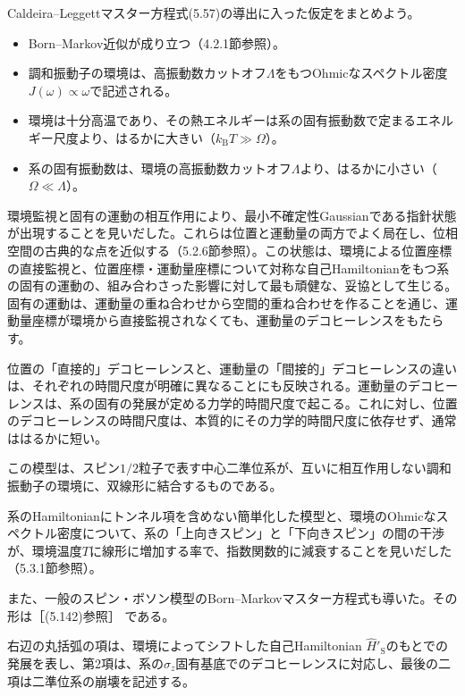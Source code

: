 \hypertarget{srcpage:239}{}\label{srcpage:239}
Caldeira--Leggettマスター方程式(5.57)の導出に入った仮定をまとめよう。
\begin{itemize}
\item Born--Markov近似が成り立つ（4.2.1節参照）。
\item 調和振動子の環境は、高振動数カットオフ$\Lambda$をもつOhmicなスペクトル密度$J(\omega)\propto\omega$で記述される。
\item 環境は十分高温であり、その熱エネルギーは系の固有振動数で定まるエネルギー尺度より、はるかに大きい（$k_{\mathrm B}T\gg\Omega$）。
\item 系の固有振動数は、環境の高振動数カットオフ$\Lambda$より、はるかに小さい（$\Omega\ll\Lambda$）。
\end{itemize}
環境監視と固有の運動の相互作用により、最小不確定性Gaussianである指針状態が出現することを見いだした。これらは位置と運動量の両方でよく局在し、位相空間の古典的な点を近似する（5.2.6節参照）。この状態は、環境による位置座標の直接監視と、位置座標・運動量座標について対称な自己Hamiltonianをもつ系の固有の運動の、組み合わさった影響に対して最も頑健な、妥協として生じる。固有の運動は、運動量の重ね合わせから空間的重ね合わせを作ることを通じ、運動量座標が環境から直接監視されなくても、運動量のデコヒーレンスをもたらす。

位置の「直接的」デコヒーレンスと、運動量の「間接的」デコヒーレンスの違いは、それぞれの時間尺度が明確に異なることにも反映される。運動量のデコヒーレンスは、系の固有の発展が定める力学的時間尺度で起こる。これに対し、位置のデコヒーレンスの時間尺度は、本質的にその力学的時間尺度に依存せず、通常ははるかに短い。

この模型は、スピン$1/2$粒子で表す中心二準位系が、互いに相互作用しない調和振動子の環境に、双線形に結合するものである。

系のHamiltonianにトンネル項を含めない簡単化した模型と、環境のOhmicなスペクトル密度について、系の「上向きスピン」と「下向きスピン」の間の干渉が、環境温度$T$に線形に増加する率で、指数関数的に減衰することを見いだした（5.3.1節参照）。

また、一般のスピン・ボソン模型のBorn--Markovマスター方程式も導いた。その形は［(5.142)参照］
である。

\hypertarget{srcpage:240}{}\label{srcpage:240}
右辺の丸括弧の項は、環境によってシフトした自己Hamiltonian $\hat H'_{\mathrm S}$のもとでの発展を表し、第2項は、系の$\hat\sigma_z$固有基底でのデコヒーレンスに対応し、最後の二項は二準位系の崩壊を記述する。

